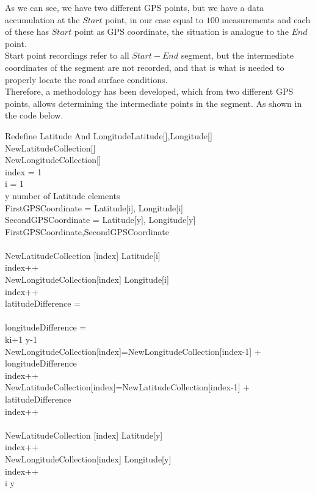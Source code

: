 \documentclass{standalone}
\begin{document}
\noindent As we can see, we have two different GPS points, but we have a data accumulation at the $Start$ point, in our case equal to $100$ measurements and each of these has $Start$ point as GPS coordinate, the situation is analogue to the $End$ point.\\
Start point recordings refer to all $Start-End$ segment, but the intermediate coordinates of the segment are not recorded, and that is what is needed to properly locate the road surface conditions.\\
Therefore, a methodology has been developed, which from two different GPS points, allows determining the intermediate points in the segment. As shown in the code below.\\
\begin{pseudocode}{Redefine Latitude And Longitude}{Latitude[],Longitude[]}
\label{MergeSort}
\\
\BEGIN
NewLatitudeCollection[]\\
NewLongitudeCollection[]\\
index = 1\\ 
i = 1\\
\FOR y \TO number \thinspace of \thinspace
Latitude \thinspace elements \DO \\
\BEGIN
FirstGPSCoordinate = Latitude[i], Longitude[i]\\
SecondGPSCoordinate = Latitude[y], Longitude[y]\\
\IF {} {FirstGPSCoordinate,SecondGPSCoordinate}  \DO\\
\BEGIN
{}\\
NewLatitudeCollection [index] \GETS Latitude[i]\\
index++\\
NewLongitudeCollection[index] \GETS Longitude[i]\\
index++\\
latitudeDifference = \\\\
longitudeDifference = \\
\FOR k\GETS i+1 \TO y-1\DO \\
\BEGIN
NewLongitudeCollection[index]=NewLongitudeCollection[index-1] + longitudeDifference\\
index++\\
NewLatitudeCollection[index]=NewLatitudeCollection[index-1] + latitudeDifference\\
index++\\
\END \\

NewLatitudeCollection [index] \GETS Latitude[y]\\
index++\\
NewLongitudeCollection[index] \GETS Longitude[y]\\
index++\\
i \GETS y\\ 
\END
\END
\END
\end{pseudocode} 	
\end{document}
